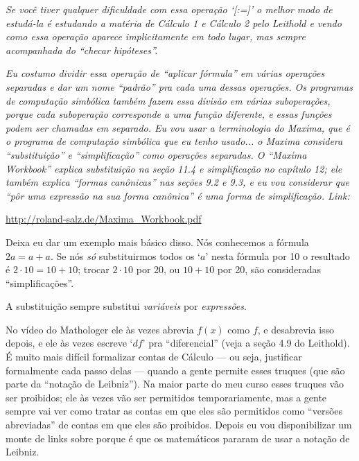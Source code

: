 \documentclass[oneside,12pt]{article}
\begin{document}
\msk

{\sl Se você tiver qualquer dificuldade com essa operação `[:=]' o
  melhor modo de estudá-la é estudando a matéria de Cálculo 1 e
  Cálculo 2 pelo Leithold e vendo como essa operação aparece
  implicitamente em todo lugar, mas sempre acompanhada do ``checar
  hipóteses''.}

{\sl Eu costumo dividir essa operação de ``aplicar fórmula'' em várias
  operações separadas e dar um nome ``padrão'' pra cada uma dessas
  operações. Os programas de computação simbólica também fazem essa
  divisão em várias suboperações, porque cada suboperação corresponde
  a uma função diferente, e essas funções podem ser chamadas em
  separado. Eu vou usar a terminologia do Maxima, que é o programa de
  computação simbólica que eu tenho usado... o Maxima considera
  ``substituição'' e ``simplificação'' como operações separadas. O
  ``Maxima Workbook'' explica substituição na seção 11.4 e
  simplificação no capítulo 12; ele também explica ``formas
  canônicas'' nas seções 9.2 e 9.3, e eu vou considerar que ``pôr uma
  expressão na sua forma canônica'' é uma forma de simplificação.
  Link:}

\url{http://roland-salz.de/Maxima_Workbook.pdf}

\msk

Deixa eu dar um exemplo mais básico disso. Nós conhecemos a fórmula
$2a = a+a$. Se nós {\sl só} substituirmos todos os `$a$' nesta fórmula
por 10 o resultado é $2·10 = 10+10$; trocar $2·10$ por 20, ou $10+10$
por 20, são consideradas ``simplificações''.

A substituição sempre substitui {\sl variáveis} por {\sl expressões}.

\msk

No vídeo do Mathologer ele às vezes abrevia $f(x)$ como $f$, e
desabrevia isso depois, e ele às vezes escreve `$df$' pra
``diferencial'' (veja a seção 4.9 do Leithold). É muito mais difícil
formalizar contas de Cálculo --- ou seja, justificar formalmente cada
passo delas --- quando a gente permite esses truques (que são parte da
``notação de Leibniz''). Na maior parte do meu curso esses truques vão
ser proibidos; ele às vezes vão ser permitidos temporariamente, mas a
gente sempre vai ver como tratar as contas em que eles são permitidos
como ``versões abreviadas'' de contas em que eles são proibidos.
Depois eu vou disponibilizar um monte de links sobre porque é que os
matemáticos pararam de usar a notação de Leibniz.

\end{document}
